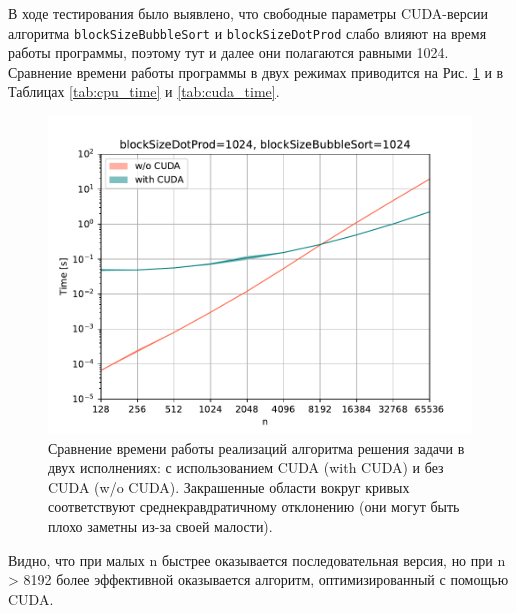 В ходе тестирования было выявлено, что свободные параметры CUDA-версии алгоритма \texttt{blockSizeBubbleSort} и \texttt{blockSizeDotProd} слабо влияют на время работы программы, поэтому тут и далее они полагаются равными 1024. Сравнение времени работы программы в двух режимах приводится на Рис. \ref{fig:time} и в Таблицах \ref{tab:cpu_time} и \ref{tab:cuda_time}.
\begin{figure}
    \centering
    \includegraphics{fig/time.pdf}
    \caption{Сравнение времени работы реализаций алгоритма решения задачи в двух исполнениях: с использованием  CUDA (with CUDA) и без CUDA (w/o CUDA). Закрашенные области вокруг кривых соответствуют среднекравдратичному отклонению (они могут быть плохо заметны из-за своей малости).}
    \label{fig:time}
\end{figure}
Видно, что при малых n быстрее оказывается последовательная версия, но при n > 8192 более эффективной оказывается алгоритм, оптимизированный с помощью CUDA.